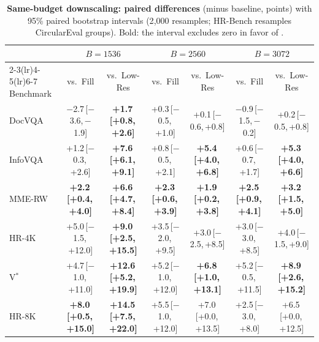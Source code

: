 \begin{table}[t]
  \centering
  \scriptsize
  \setlength{\tabcolsep}{2.4pt}
  \begin{tabular}{l cc cc cc}
    \toprule
    & \multicolumn{2}{c}{$B=1536$} & \multicolumn{2}{c}{$B=2560$} & \multicolumn{2}{c}{$B=3072$} \\
    \cmidrule(lr){2-3}\cmidrule(lr){4-5}\cmidrule(lr){6-7}
    Benchmark & vs.\ Fill & vs.\ Low-Res & vs.\ Fill & vs.\ Low-Res & vs.\ Fill & vs.\ Low-Res \\
    \midrule
    DocVQA & $-$2.7\,[$-$3.6,\,$-$1.9] & \textbf{+1.7\,[+0.8,\,+2.6]} & +0.3\,[$-$0.5,\,+1.0] & +0.1\,[$-$0.6,\,+0.8] & $-$0.9\,[$-$1.5,\,$-$0.2] & +0.2\,[$-$0.5,\,+0.8] \\
    InfoVQA & +1.2\,[$-$0.3,\,+2.6] & \textbf{+7.6\,[+6.1,\,+9.1]} & +0.8\,[$-$0.5,\,+2.1] & \textbf{+5.4\,[+4.0,\,+6.8]} & +0.6\,[$-$0.7,\,+1.7] & \textbf{+5.3\,[+4.0,\,+6.6]} \\
    MME-RW & \textbf{+2.2\,[+0.4,\,+4.0]} & \textbf{+6.6\,[+4.7,\,+8.4]} & \textbf{+2.3\,[+0.6,\,+3.9]} & \textbf{+1.9\,[+0.2,\,+3.8]} & \textbf{+2.5\,[+0.9,\,+4.1]} & \textbf{+3.2\,[+1.5,\,+5.0]} \\
    HR-4K & +5.0\,[$-$1.5,\,+12.0] & \textbf{+9.0\,[+2.5,\,+15.5]} & +3.5\,[$-$2.0,\,+9.5] & +3.0\,[$-$2.5,\,+8.5] & +3.0\,[$-$3.0,\,+8.5] & +4.0\,[$-$1.5,\,+9.0] \\
    V$^*$ & +4.7\,[$-$1.0,\,+11.0] & \textbf{+12.6\,[+5.2,\,+19.9]} & +5.2\,[$-$1.0,\,+12.0] & \textbf{+6.8\,[+1.0,\,+13.1]} & +5.2\,[$-$0.5,\,+11.5] & \textbf{+8.9\,[+2.6,\,+15.2]} \\
    HR-8K & \textbf{+8.0\,[+0.5,\,+15.0]} & \textbf{+14.5\,[+7.5,\,+22.0]} & +5.5\,[$-$1.0,\,+12.0] & +7.0\,[+0.0,\,+13.5] & +2.5\,[$-$3.0,\,+8.0] & +6.5\,[+0.0,\,+12.5] \\
    \bottomrule
  \end{tabular}
  \caption{\textbf{Same-budget downscaling: paired differences} (\method minus baseline, points) with 95\% paired bootstrap intervals (2{,}000 resamples; HR-Bench resamples CircularEval groups). Bold: the interval excludes zero in favor of \method.}
  \label{tab:downscale_delta}
\end{table}
